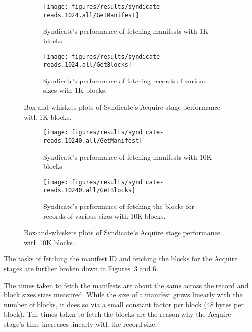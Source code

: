 \begin{figure}[htp!]
   \centering
   \begin{subfigure}[b]{.8\textwidth}
      \texttt{[image: figures/results/syndicate-reads.1024.all/GetManifest]}
      \label{fig:syndicate-getmanifest-1k}
      \caption{Syndicate's performance of fetching manifests with 1K blocks}
   \end{subfigure}
   \begin{subfigure}[b]{.8\textwidth}
      \texttt{[image: figures/results/syndicate-reads.1024.all/GetBlocks]}
      \label{fig:syndicate-getblocks-1k}
      \caption{Syndicate's performance of fetching records of various sizes with
      1K blocks.}
   \end{subfigure}
   \caption{Box-and-whiskers plots of Syndicate's Acquire stage performance with 1K
   blocks.}
   \label{fig:syndicate-acquire-breakdown-1K}
\end{figure}

\begin{figure}[htp!]
   \centering
   \begin{subfigure}[b]{.8\textwidth}
      \texttt{[image: figures/results/syndicate-reads.10240.all/GetManifest]}
      \label{fig:syndicate-getmanifest-10k}
      \caption{Syndicate's performance of fetching manifests with 10K blocks}
   \end{subfigure}
   \begin{subfigure}[b]{.8\textwidth}
      \texttt{[image: figures/results/syndicate-reads.10240.all/GetBlocks]}
      \label{fig:syndicate-read-acquire-1k}
      \caption{Syndicate's performance of fetching the blocks for records of various sizes with
      10K blocks.}
   \end{subfigure}
   \caption{Box-and-whiskers plots of Syndicate's Acquire stage performance with
   10K blocks.}
   \label{fig:syndicate-acquire-breakdown-10K}
\end{figure}

The tasks of fetching the manifest ID and fetching
the blocks for the Acquire stages are further broken down in
Figures~\ref{fig:syndicate-acquire-breakdown-1K} and
\ref{fig:syndicate-acquire-breakdown-10K}.

The times taken to fetch the manifests are about the same across the record
and block sizes sizes measured.  While
the size of a manifest grows linearly with the number of blocks, it does so via
a small constant factor per block (48 bytes per block).  The times taken to
fetch the blocks are the reason why the Acquire stage's time increases linearly
with the record size.


